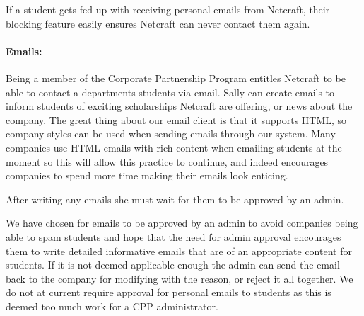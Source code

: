     If a student gets fed up with receiving personal emails from Netcraft, their blocking feature easily ensures Netcraft can never contact them again.

  \paragraph{Emails:}
    Being a member of the Corporate Partnership Program entitles Netcraft to be able to contact a departments students via email. Sally can create emails to inform students of exciting scholarships Netcraft are offering, or news about the company. The great thing about our email client is that it supports HTML, so company styles can be used when sending emails through our system. Many companies use HTML emails with rich content when emailing students at the moment so this will allow this practice to continue, and indeed encourages companies to spend more time making their emails look enticing.

    After writing any emails she must wait for them to be approved by an admin. 

    We have chosen for emails to be approved by an admin to avoid companies being able to spam students and hope that the need for admin approval encourages them to write detailed informative emails that are of an appropriate content for students. If it is not deemed applicable enough the admin can send the email back to the company for modifying with the reason, or reject it all together.
    We do not at current require approval for personal emails to students as this is deemed too much work for a CPP administrator.  


